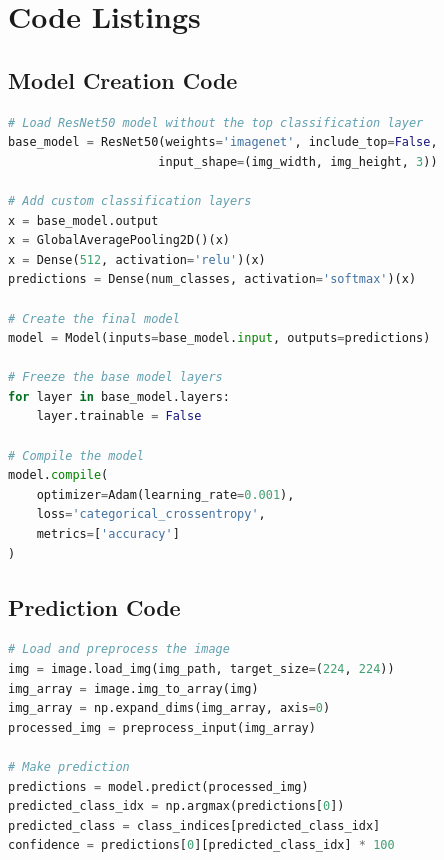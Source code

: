 \documentclass[11pt,a4paper]{report}
\begin{document}
\section{Code Listings}

\subsection{Model Creation Code}
\begin{lstlisting}[language=Python, caption=Model creation code from fine\_tune.py]
# Load ResNet50 model without the top classification layer
base_model = ResNet50(weights='imagenet', include_top=False, 
                     input_shape=(img_width, img_height, 3))

# Add custom classification layers
x = base_model.output
x = GlobalAveragePooling2D()(x)
x = Dense(512, activation='relu')(x)
predictions = Dense(num_classes, activation='softmax')(x)

# Create the final model
model = Model(inputs=base_model.input, outputs=predictions)

# Freeze the base model layers
for layer in base_model.layers:
    layer.trainable = False

# Compile the model
model.compile(
    optimizer=Adam(learning_rate=0.001),
    loss='categorical_crossentropy',
    metrics=['accuracy']
)
\end{lstlisting}

\subsection{Prediction Code}
\begin{lstlisting}[language=Python, caption=Prediction code from quick\_predict.py]
# Load and preprocess the image
img = image.load_img(img_path, target_size=(224, 224))
img_array = image.img_to_array(img)
img_array = np.expand_dims(img_array, axis=0)
processed_img = preprocess_input(img_array)

# Make prediction
predictions = model.predict(processed_img)
predicted_class_idx = np.argmax(predictions[0])
predicted_class = class_indices[predicted_class_idx]
confidence = predictions[0][predicted_class_idx] * 100
\end{lstlisting}
\end{document}
